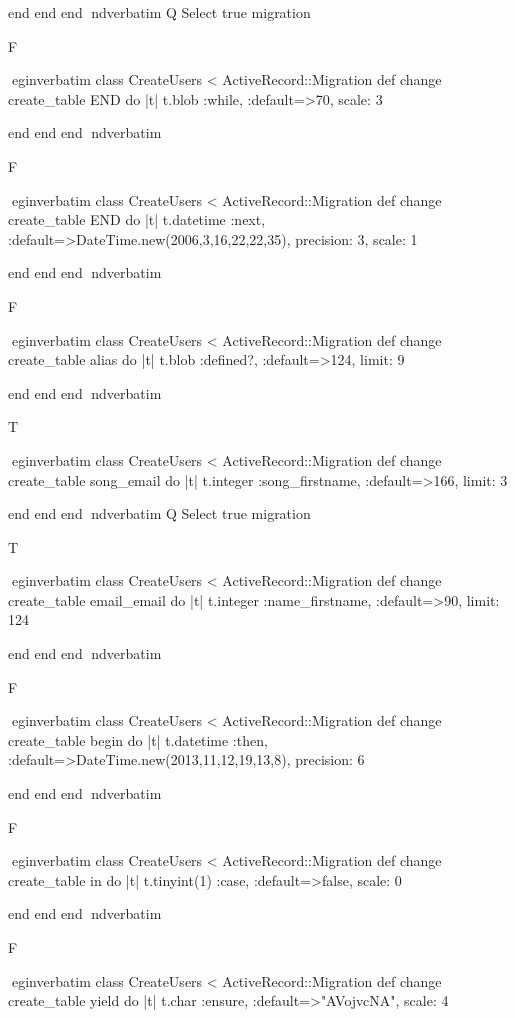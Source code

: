     end 
  end 
end
nd{verbatim}
Q
 Select true migration

F

egin{verbatim}
 class CreateUsers < ActiveRecord::Migration 
  def change 
    create_table END do |t| 
      t.blob :while, :default=>70, scale: 3
    
    end 
  end 
end
nd{verbatim}

F

egin{verbatim}
 class CreateUsers < ActiveRecord::Migration 
  def change 
    create_table END do |t| 
      t.datetime :next, :default=>DateTime.new(2006,3,16,22,22,35), precision: 3, scale: 1
    
    end 
  end 
end
nd{verbatim}

F

egin{verbatim}
 class CreateUsers < ActiveRecord::Migration 
  def change 
    create_table alias do |t| 
      t.blob :defined?, :default=>124, limit: 9
    
    end 
  end 
end
nd{verbatim}

T

egin{verbatim}
 class CreateUsers < ActiveRecord::Migration 
  def change 
    create_table song_email do |t| 
      t.integer :song_firstname, :default=>166, limit: 3
    
    end 
  end 
end
nd{verbatim}
Q
 Select true migration

T

egin{verbatim}
 class CreateUsers < ActiveRecord::Migration 
  def change 
    create_table email_email do |t| 
      t.integer :name_firstname, :default=>90, limit: 124
    
    end 
  end 
end
nd{verbatim}

F

egin{verbatim}
 class CreateUsers < ActiveRecord::Migration 
  def change 
    create_table begin do |t| 
      t.datetime :then, :default=>DateTime.new(2013,11,12,19,13,8), precision: 6
    
    end 
  end 
end
nd{verbatim}

F

egin{verbatim}
 class CreateUsers < ActiveRecord::Migration 
  def change 
    create_table in do |t| 
      t.tinyint(1) :case, :default=>false, scale: 0
    
    end 
  end 
end
nd{verbatim}

F

egin{verbatim}
 class CreateUsers < ActiveRecord::Migration 
  def change 
    create_table yield do |t| 
      t.char :ensure, :default=>"AVojvcNA", scale: 4
    
